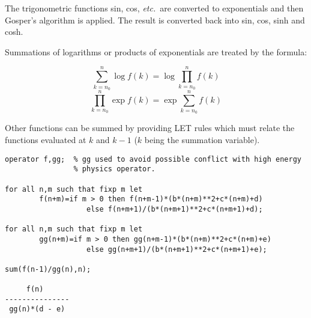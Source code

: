 The trigonometric functions sin, cos, {\em etc.\ }are converted to exponentials
and then Gosper's algorithm is applied.  The result is converted back into
sin, cos, sinh and cosh.

Summations of logarithms or products of exponentials are treated by the
formula:

\vspace{.1in}
\hspace*{2em} \[ \sum_{k=n_0}^{n} \log f(k) = \log \prod_{k=n_0}^n f(k) \]
\vspace{.1in}
\hspace*{2em} \[ \prod_{k=n_0}^n \exp f(k) = \exp \sum_{k=n_0}^n f(k) \]
\vspace{.1in}

Other functions can be summed by providing LET rules which must relate the
functions evaluated at $k$ and $k - 1$ ($k$ being the summation variable).

\begin{verbatim}
operator f,gg;  % gg used to avoid possible conflict with high energy
                % physics operator.

for all n,m such that fixp m let
        f(n+m)=if m > 0 then f(n+m-1)*(b*(n+m)**2+c*(n+m)+d)
                   else f(n+m+1)/(b*(n+m+1)**2+c*(n+m+1)+d);

for all n,m such that fixp m let
        gg(n+m)=if m > 0 then gg(n+m-1)*(b*(n+m)**2+c*(n+m)+e)
                   else gg(n+m+1)/(b*(n+m+1)**2+c*(n+m+1)+e);

sum(f(n-1)/gg(n),n);

     f(n)
---------------
 gg(n)*(d - e)
\end{verbatim}

